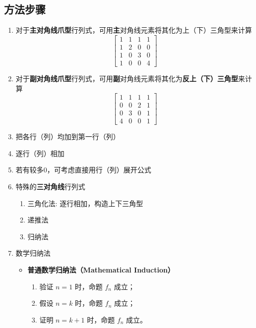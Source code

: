 \documentclass[a4paper,12pt]{article}
\begin{document}
    \subsection{方法步骤}

    \begin{enumerate}
        \item 对于\textbf{主对角线爪型}行列式，可用\textbf{主}对角线元素将其化为上（下）三角型来计算
        \[
            \begin{bmatrix}
                1 & 1 & 1 & 1 \\
                1 & 2 & 0 & 0 \\
                1 & 0 & 3 & 0 \\
                1 & 0 & 0 & 4
            \end{bmatrix}
        \]
        \item 对于\textbf{副对角线爪型}行列式，可用\textbf{副}对角线元素将其化为\textbf{反上（下）三角型}来计算
        \[
            \begin{bmatrix}
                1 & 1 & 1 & 1 \\
                0 & 0 & 2 & 1 \\
                0 & 3 & 0 & 1 \\
                4 & 0 & 0 & 1
            \end{bmatrix}
        \]
        \item 把各行（列）均加到第一行（列）
        \item 逐行（列）相加
        \item 若有较多$0$，可考虑直接用行（列）展开公式
        \item 特殊的\textbf{三对角线}行列式
        \begin{enumerate}
            \item 三角化法: 逐行相加，构造上下三角型
            \item 递推法
            \item 归纳法
        \end{enumerate}
        \item 数学归纳法
        \begin{itemize}
            \item \textbf{普通数学归纳法（Mathematical Induction）}
            \begin{enumerate}
                \item 验证 $n = 1$ 时，命题 $f_n$ 成立；
                \item 假设 $n = k$ 时，命题 $f_n$ 成立；
                \item 证明 $n = k + 1$ 时，命题 $f_n$ 成立。
            \end{enumerate}


\end{itemize}
\end{enumerate}
\end{document}
